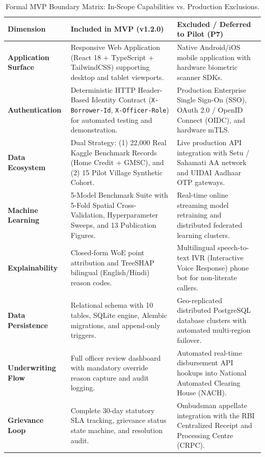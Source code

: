\documentclass[11pt,a4paper,oneside]{report}
\begin{document}
\begin{table}[H]
\centering
\small
\renewcommand{\arraystretch}{1.25}
\begin{tabularx}{\textwidth}{p{3.2cm}X X}
  \toprule
  \textbf{Dimension} & \textbf{Included in MVP (v1.2.0)} & \textbf{Excluded / Deferred to Pilot (P7)} \\
  \midrule
  \textbf{Application Surface} & Responsive Web Application (React 18 + TypeScript + TailwindCSS) supporting desktop and tablet viewports. & Native Android/iOS mobile application with hardware biometric scanner SDKs. \\
  \addlinespace
  \textbf{Authentication} & Deterministic HTTP Header-Based Identity Contract (\texttt{X-Borrower-Id}, \texttt{X-Officer-Role}) for automated testing and demonstration. & Production Enterprise Single Sign-On (SSO), OAuth 2.0 / OpenID Connect (OIDC), and hardware mTLS. \\
  \addlinespace
  \textbf{Data Ecosystem} & Dual Strategy: (1) 22,000 Real Kaggle Benchmark Records (Home Credit + GMSC), and (2) 15 Pilot Village Synthetic Cohort. & Live production API integration with Setu / Sahamati AA network and UIDAI Aadhaar OTP gateways. \\
  \addlinespace
  \textbf{Machine Learning} & 5-Model Benchmark Suite with 5-Fold Spatial Cross-Validation, Hyperparameter Sweeps, and 13 Publication Figures. & Real-time online streaming model retraining and distributed federated learning clusters. \\
  \addlinespace
  \textbf{Explainability} & Closed-form WoE point attribution and TreeSHAP bilingual (English/Hindi) reason codes. & Multilingual speech-to-text IVR (Interactive Voice Response) phone bot for non-literate callers. \\
  \addlinespace
  \textbf{Data Persistence} & Relational schema with 10 tables, SQLite engine, Alembic migrations, and append-only triggers. & Geo-replicated distributed PostgreSQL database clusters with automated multi-region failover. \\
  \addlinespace
  \textbf{Underwriting Flow} & Full officer review dashboard with mandatory override reason capture and audit logging. & Automated real-time disbursement API hookups into National Automated Clearing House (NACH). \\
  \addlinespace
  \textbf{Grievance Loop} & Complete 30-day statutory SLA tracking, grievance status state machine, and resolution audit. & Ombudsman appellate integration with the RBI Centralized Receipt and Processing Centre (CRPC). \\
  \bottomrule
\end{tabularx}
\caption{Formal MVP Boundary Matrix: In-Scope Capabilities vs. Production Exclusions.}
\label{tab:scope_matrix}
\end{table}
\end{document}
